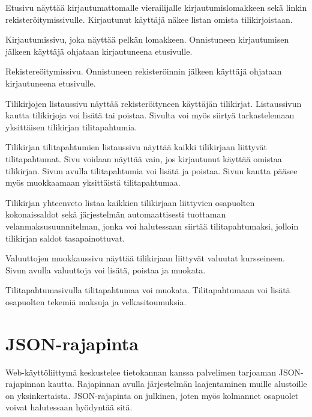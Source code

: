 \documentclass[a4paper,parskip=half]{scrartcl}
\begin{document}
\begin{description}[style=nextline]
  \item[/]{
      Etusivu näyttää kirjautumattomalle vierailijalle kirjautumislomakkeen sekä
      linkin rekisteröitymissivulle. Kirjautunut käyttäjä näkee listan omista
      tilikirjoistaan.
    }
  \item[/login]{
      Kirjautumissivu, joka näyttää pelkän lomakkeen. Onnistuneen kirjautumisen
      jälkeen käyttäjä ohjataan kirjautuneena etusivulle.
    }
  \item[/signup]{
      Rekistereöitymissivu. Onnistuneen rekisteröinnin jälkeen käyttäjä ohjataan
      kirjautuneena etusivulle.
    }
  \item[/ledgers]{
      Tilikirjojen listaussivu näyttää rekisteröityneen käyttäjän tilikirjat.
      Listaussivun kautta tilikirjoja voi lisätä tai poistaa. Sivulta voi myös
      siirtyä tarkastelemaan yksittäisen tilikirjan tilitapahtumia.
    }
  \item[/ledgers/:ledgerId]{
      Tilikirjan tilitapahtumien listaussivu näyttää kaikki tilikirjaan
      liittyvät tilitapahtumat. Sivu voidaan näyttää vain, jos kirjautunut
      käyttää omistaa tilikirjan. Sivun avulla tilitapahtumia voi lisätä ja
      poistaa. Sivun kautta pääsee myös muokkaamaan yksittäistä tilitapahtumaa.
    }
  \item[/ledgers/:ledgerId/summary]{
      Tilikirjan yhteenveto listaa kaikkien tilikirjaan liittyvien osapuolten
      kokonaissaldot sekä järjestelmän automaattisesti tuottaman
      velanmaksusuunnitelman, jonka voi halutessaan siirtää tilitapahtumaksi,
      jolloin tilikirjan saldot tasapainottuvat.
    }
  \item[/ledgers/:ledgerId/currencies]{
      Valuuttojen muokkaussivu näyttää tilikirjaan liittyvät valuutat
      kursseineen.  Sivun avulla valuuttoja voi lisätä, poistaa ja muokata.
    }
  \item[/ledgers/:ledgersId/:transactionId]{
      Tilitapahtumasivulla tilitapahtumaa voi muokata. Tilitapahtumaan voi
      lisätä osapuolten tekemiä maksuja ja velkasitoumuksia.
    }
\end{description}

\section{JSON-rajapinta}

Web-käyttöliittymä keskustelee tietokannan kanssa palvelimen tarjoaman
JSON-rajapinnan kautta. Rajapinnan avulla järjestelmän laajentaminen muille
alustoille on yksinkertaista. JSON-rajapinta on julkinen, joten myös kolmannet
osapuolet voivat halutessaan hyödyntää sitä.
\end{document}
